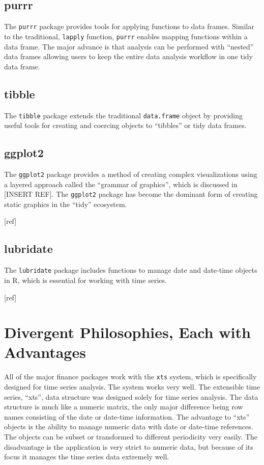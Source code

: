\subsection{purrr}\label{purrr}

The \texttt{purrr} package provides tools for applying functions to data
frames. Similar to the traditional, \texttt{lapply} function,
\texttt{purrr} enables mapping functions within a data frame. The major
advance is that analysis can be performed with ``nested'' data frames
allowing users to keep the entire data analysis workflow in one tidy
data frame.

\subsection{tibble}\label{tibble}

The \texttt{tibble} package extends the traditional \texttt{data.frame}
object by providing useful tools for creating and coercing objects to
``tibbles'' or tidy data frames.

\subsection{ggplot2}\label{ggplot2}

The \texttt{ggplot2} package provides a method of creating complex
visualizations using a layered approach called the ``grammar of
graphics'', which is discussed in {[}INSERT REF{]}. The \texttt{ggplot2}
package has become the dominant form of creating static graphics in the
``tidy'' ecosystem.

{[}ref{]}

\subsection{lubridate}\label{lubridate}

The \texttt{lubridate} package includes functions to manage date and
date-time objects in R, which is essential for working with time series.

{[}ref{]}

\section{Divergent Philosophies, Each with
Advantages}\label{divergent-philosophies-each-with-advantages}

All of the major finance packages work with the \texttt{xts} system,
which is specifically designed for time series analysis. The system
works very well. The extensible time series, ``xts'', data structure was
designed solely for time series analysis. The data structure is much
like a numeric matrix, the only major difference being row names
consisting of the date or date-time information. The advantage to
``xts'' objects is the ability to manage numeric data with date or
date-time references. The objects can be subset or transformed to
different periodicity very easily. The disadvantage is the application
is very strict to numeric data, but because of its focus it manages the
time series data extremely well.


